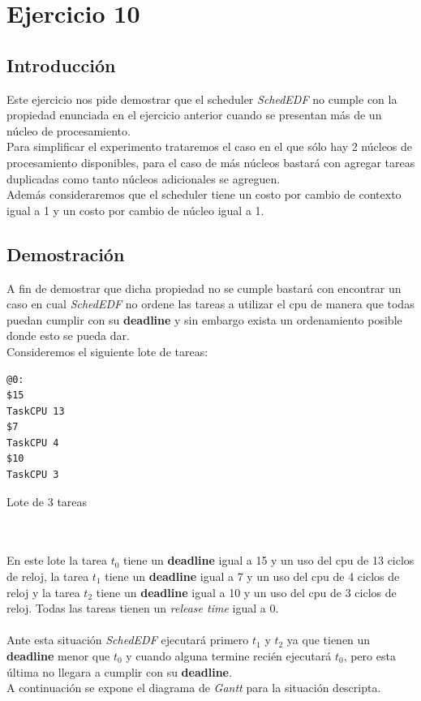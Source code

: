 \section{Ejercicio 10}

\subsection{Introducción}

Este ejercicio nos pide demostrar que el scheduler \textit{SchedEDF} no cumple con la propiedad enunciada en el ejercicio anterior cuando se presentan más de un núcleo de procesamiento.\\
Para simplificar el experimento trataremos el caso en el que sólo hay 2 núcleos de procesamiento disponibles, para el caso de más núcleos bastará con agregar tareas duplicadas como tanto núcleos adicionales se agreguen.\\
Además consideraremos que el scheduler tiene un costo por cambio de contexto igual a 1 y un costo por cambio de núcleo igual a 1.

\subsection{Demostración}
A fin de demostrar que dicha propiedad no se cumple bastará con encontrar un caso en cual \textit{SchedEDF} no ordene las tareas a utilizar el cpu de manera que todas puedan cumplir con su \textbf{deadline} y sin embargo exista un ordenamiento posible donde esto se pueda dar.\\
Consideremos el siguiente lote de tareas:

\begin{minipage}[t]{0.3\textwidth}
\begin{tarea}[H]
\begin{verbatim}
@0:
$15
TaskCPU 13
$7
TaskCPU 4
$10
TaskCPU 3
\end{verbatim}
\caption{Lote de 3 tareas}
\label{ej10-task}
\end{tarea}
\end{minipage}\\\\
En este lote la tarea \textit{$t_0$} tiene un \textbf{deadline} igual a 15 y un uso del cpu de 13 ciclos de reloj, la tarea \textit{$t_1$} tiene un \textbf{deadline} igual a 7 y un uso del cpu de 4 ciclos de reloj y la tarea \textit{$t_2$} tiene un \textbf{deadline} igual a 10 y un uso del cpu de 3 ciclos de reloj. Todas las tareas tienen un \textit{release time} igual a 0.\\\\
Ante esta situación \textit{SchedEDF} ejecutará primero \textit{$t_1$} y \textit{$t_2$} ya que tienen un \textbf{deadline} menor que \textit{$t_0$} y cuando alguna termine recién ejecutará \textit{$t_0$}, pero esta última no llegara a cumplir con su \textbf{deadline}.\\
A continuación se expone el diagrama de \textit{Gantt} para la situación descripta.


